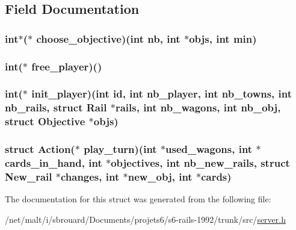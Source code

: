 \subsection{Field Documentation}
\hypertarget{structf__player_a30b2a1a6dc61d60d60112b63199f72f6}{
\subsubsection[{choose\-\_\-objective}]{\setlength{\rightskip}{0pt plus 5cm}int$\ast$($\ast$ choose\-\_\-objective)(int nb, int $\ast$objs, int min)}}\label{structf__player_a30b2a1a6dc61d60d60112b63199f72f6}
\hypertarget{structf__player_ae47872a4531e4c79eb94348179812809}{
\subsubsection[{free\-\_\-player}]{\setlength{\rightskip}{0pt plus 5cm}int($\ast$ free\-\_\-player)()}}\label{structf__player_ae47872a4531e4c79eb94348179812809}
\hypertarget{structf__player_ae803883f2825f7d13bbf12ad4c9b92ac}{
\subsubsection[{init\-\_\-player}]{\setlength{\rightskip}{0pt plus 5cm}int($\ast$ init\-\_\-player)(int id, int nb\-\_\-player, int nb\-\_\-towns, int nb\-\_\-rails, struct {\bf Rail} $\ast$rails, int nb\-\_\-wagons, int nb\-\_\-obj, struct {\bf Objective} $\ast$objs)}}\label{structf__player_ae803883f2825f7d13bbf12ad4c9b92ac}
\hypertarget{structf__player_acbc97ea5cbb0c80c1a3ce98fea12c52e}{
\subsubsection[{play\-\_\-turn}]{\setlength{\rightskip}{0pt plus 5cm}struct {\bf Action}($\ast$ play\-\_\-turn)(int $\ast$used\-\_\-wagons, int $\ast$cards\-\_\-in\-\_\-hand, int $\ast$objectives, int nb\-\_\-new\-\_\-rails, struct {\bf New\-\_\-rail} $\ast$changes, int $\ast$new\-\_\-obj, int $\ast$cards)}}\label{structf__player_acbc97ea5cbb0c80c1a3ce98fea12c52e}


The documentation for this struct was generated from the following file\-:\begin{DoxyCompactItemize}
\item 
/net/malt/i/sbrouard/\-Documents/projets6/s6-\/rails-\/1992/trunk/src/\hyperlink{server_8h}{server.\-h}\end{DoxyCompactItemize}

